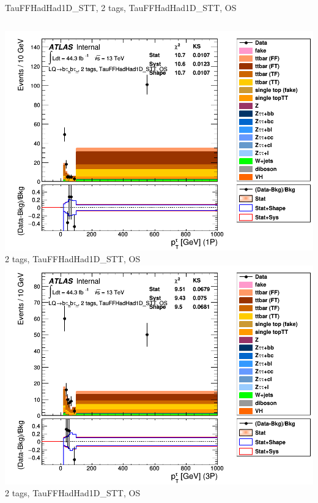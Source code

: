 \begin{frame}{TauFFHadHad1D\_STT, 2 tags, TauFFHadHad1D\_STT, OS}
  \begin{columns}[c]
    \centering\includegraphics[width=\textwidth]{C_2tag2pjet_0ptv_OS_TauPt1P}\\
    2 tags, TauFFHadHad1D\_STT, OS
    \centering\includegraphics[width=\textwidth]{C_2tag2pjet_0ptv_OS_TauPt3P}\\
    2 tags, TauFFHadHad1D\_STT, OS
  \end{columns}
  \begin{columns}[c]

\end{columns}
\end{frame}
